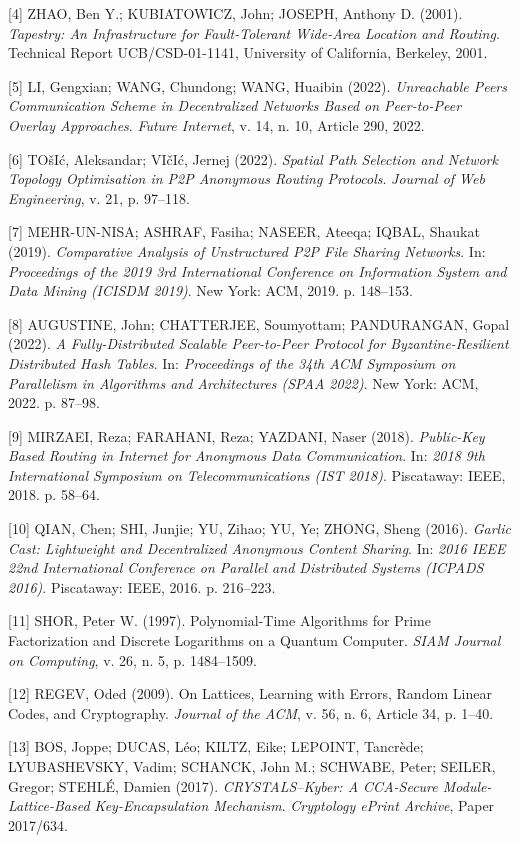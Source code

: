 \documentclass[12pt,a4paper]{article}
\begin{document}
[4] ZHAO, Ben Y.; KUBIATOWICZ, John; JOSEPH, Anthony D. (2001). 
\textit{Tapestry: An Infrastructure for Fault-Tolerant Wide-Area Location and Routing}. 
Technical Report UCB/CSD-01-1141, University of California, Berkeley, 2001.

[5] LI, Gengxian; WANG, Chundong; WANG, Huaibin (2022).
\textit{Unreachable Peers Communication Scheme in Decentralized Networks Based on Peer-to-Peer Overlay Approaches}.
\textit{Future Internet}, v. 14, n. 10, Article 290, 2022.

[6] TO\v{s}I\'{c}, Aleksandar; VI\v{c}I\'{c}, Jernej (2022).
\textit{Spatial Path Selection and Network Topology Optimisation in P2P Anonymous Routing Protocols}.
\textit{Journal of Web Engineering}, v. 21, p. 97--118.

[7] MEHR-UN-NISA; ASHRAF, Fasiha; NASEER, Ateeqa; IQBAL, Shaukat (2019).
\textit{Comparative Analysis of Unstructured P2P File Sharing Networks}.
In: \textit{Proceedings of the 2019 3rd International Conference on Information System and Data Mining (ICISDM 2019)}.
New York: ACM, 2019. p. 148--153.

[8] AUGUSTINE, John; CHATTERJEE, Soumyottam; PANDURANGAN, Gopal (2022).
\textit{A Fully-Distributed Scalable Peer-to-Peer Protocol for Byzantine-Resilient Distributed Hash Tables}.
In: \textit{Proceedings of the 34th ACM Symposium on Parallelism in Algorithms and Architectures (SPAA 2022)}.
New York: ACM, 2022. p. 87--98.

[9] MIRZAEI, Reza; FARAHANI, Reza; YAZDANI, Naser (2018).
\textit{Public-Key Based Routing in Internet for Anonymous Data Communication}.
In: \textit{2018 9th International Symposium on Telecommunications (IST 2018)}.
Piscataway: IEEE, 2018. p. 58--64.

[10] QIAN, Chen; SHI, Junjie; YU, Zihao; YU, Ye; ZHONG, Sheng (2016).
\textit{Garlic Cast: Lightweight and Decentralized Anonymous Content Sharing}.
In: \textit{2016 IEEE 22nd International Conference on Parallel and Distributed Systems (ICPADS 2016)}.
Piscataway: IEEE, 2016. p. 216--223.

[11] SHOR, Peter W. (1997). Polynomial-Time Algorithms for Prime Factorization and Discrete Logarithms on a Quantum Computer. \textit{SIAM Journal on Computing}, v. 26, n. 5, p. 1484--1509.

[12] REGEV, Oded (2009). On Lattices, Learning with Errors, Random Linear Codes, and Cryptography. \textit{Journal of the ACM}, v. 56, n. 6, Article 34, p. 1--40.

[13] BOS, Joppe; DUCAS, Léo; KILTZ, Eike; LEPOINT, Tancrède; LYUBASHEVSKY, Vadim; SCHANCK, John M.; SCHWABE, Peter; SEILER, Gregor; STEHLÉ, Damien (2017).
\textit{CRYSTALS--Kyber: A CCA-Secure Module-Lattice-Based Key-Encapsulation Mechanism}.
\textit{Cryptology ePrint Archive}, Paper 2017/634.
\end{document}
